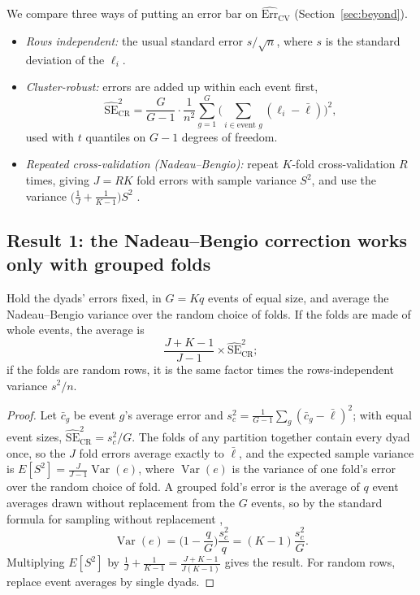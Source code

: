 We compare three ways of putting an error bar on $\widehat{\mathrm{Err}}_{\mathrm{CV}}$ (Section~\ref{sec:beyond}).
\begin{itemize}
\item \emph{Rows independent:} the usual standard error $s/\sqrt n$, where $s$ is the standard deviation of the $\ell_i$.
\item \emph{Cluster-robust:} errors are added up within each event first,
\begin{equation}\label{eq:vcr}
\widehat{\mathrm{SE}}_{\mathrm{CR}}^2=\frac{G}{G-1}\cdot\frac{1}{n^2}\sum_{g=1}^{G}\Big(\sum_{i\in\text{event }g}(\ell_i-\bar\ell)\Big)^2,
\end{equation}
used with $t$ quantiles on $G-1$ degrees of freedom.
\item \emph{Repeated cross-validation (Nadeau--Bengio):} repeat $K$-fold cross-validation $R$ times, giving $J=RK$ fold
errors with sample variance $S^2$, and use the variance $\big(\frac1J+\frac1{K-1}\big)S^2$ \cite[Section 3.1, p.~248]{Nadeau:2003}.
\end{itemize}

\subsection{Result 1: the Nadeau--Bengio correction works only with grouped folds}

\begin{prop}\label{prop:nb}
Hold the dyads' errors fixed, in $G=Kq$ events of equal size, and average the Nadeau--Bengio variance over the random
choice of folds. If the folds are made of whole events, the average is
\[
\frac{J+K-1}{J-1}\times\widehat{\mathrm{SE}}_{\mathrm{CR}}^2 ;
\]
if the folds are random rows, it is the same factor times the rows-independent variance $s^2/n$.
\end{prop}

\begin{proof}
Let $\bar c_g$ be event $g$'s average error and $s_c^2=\frac1{G-1}\sum_g(\bar c_g-\bar\ell)^2$; with equal event sizes,
$\widehat{\mathrm{SE}}_{\mathrm{CR}}^2=s_c^2/G$. The folds of any partition together contain every dyad once, so the $J$ fold errors
average exactly to $\bar\ell$, and the expected sample variance is $E[S^2]=\frac{J}{J-1}\operatorname{Var}(e)$, where $\operatorname{Var}(e)$ is the variance of
one fold's error over the random choice of fold. A grouped fold's error is the average of $q$ event averages drawn
without replacement from the $G$ events, so by the standard formula for sampling without replacement
\cite[Chapter 2]{Wolter:2007},
\[
\operatorname{Var}(e)=\Big(1-\frac qG\Big)\frac{s_c^2}{q}=(K-1)\frac{s_c^2}{G}.
\]
Multiplying $E[S^2]$ by $\frac1J+\frac1{K-1}=\frac{J+K-1}{J(K-1)}$ gives the result. For random rows, replace event
averages by single dyads.
\end{proof}

